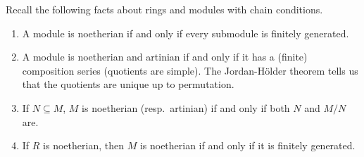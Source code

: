  \setcounter{lecture}{6}

 \renewcommand\P{\mathcal{P}}

 Recall the following facts about rings and modules with chain conditions.
 \begin{enumerate}
   \item A module is noetherian if and only if every submodule is finitely generated.
   \item A module is noetherian and artinian if and only if it has a (finite) composition
   series (quotients are simple). The Jordan-H\"older theorem tells us that the quotients
   are unique up to permutation.
   \item If $N\subseteq M$, $M$ is noetherian (resp.\ artinian) if and only if both
   $N$ and $M/N$ are.
   \item If $R$ is noetherian, then $M$ is noetherian if and only if it is finitely
   generated.
 \end{enumerate}

